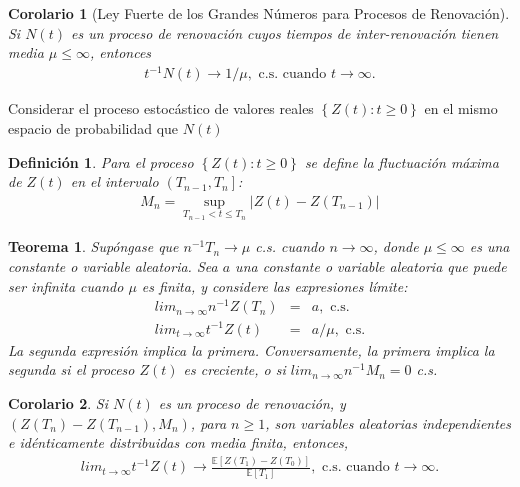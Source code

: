 \documentclass{article}
\newtheorem{Def}{Definición}
\newtheorem{Teo}{Teorema}
\newtheorem{Coro}{Corolario}
\newcommand{\esp}{\mathbb{E}}
\begin{document}
\begin{Coro}[Ley Fuerte de los Grandes N\'umeros para Procesos de Renovaci\'on]
Si $N\left(t\right)$ es un proceso de renovaci\'on cuyos tiempos de inter-renovaci\'on tienen media $\mu\leq\infty$, entonces
\begin{eqnarray}
t^{-1}N\left(t\right)\rightarrow 1/\mu,\textrm{ c.s. cuando }t\rightarrow\infty.
\end{eqnarray}

\end{Coro}


Considerar el proceso estoc\'astico de valores reales $\left\{Z\left(t\right):t\geq0\right\}$ en el mismo espacio de probabilidad que $N\left(t\right)$

\begin{Def}
Para el proceso $\left\{Z\left(t\right):t\geq0\right\}$ se define la fluctuaci\'on m\'axima de $Z\left(t\right)$ en el intervalo $\left(T_{n-1},T_{n}\right]$:
\begin{eqnarray*}
M_{n}=\sup_{T_{n-1}<t\leq T_{n}}|Z\left(t\right)-Z\left(T_{n-1}\right)|
\end{eqnarray*}
\end{Def}

\begin{Teo}
Sup\'ongase que $n^{-1}T_{n}\rightarrow\mu$ c.s. cuando $n\rightarrow\infty$, donde $\mu\leq\infty$ es una constante o variable aleatoria. Sea $a$ una constante o variable aleatoria que puede ser infinita cuando $\mu$ es finita, y considere las expresiones l\'imite:
\begin{eqnarray}
lim_{n\rightarrow\infty}n^{-1}Z\left(T_{n}\right)&=&a,\textrm{ c.s.}\\
lim_{t\rightarrow\infty}t^{-1}Z\left(t\right)&=&a/\mu,\textrm{ c.s.}
\end{eqnarray}
La segunda expresi\'on implica la primera. Conversamente, la primera implica la segunda si el proceso $Z\left(t\right)$ es creciente, o si $lim_{n\rightarrow\infty}n^{-1}M_{n}=0$ c.s.
\end{Teo}

\begin{Coro}
Si $N\left(t\right)$ es un proceso de renovaci\'on, y $\left(Z\left(T_{n}\right)-Z\left(T_{n-1}\right),M_{n}\right)$, para $n\geq1$, son variables aleatorias independientes e id\'enticamente distribuidas con media finita, entonces,
\begin{eqnarray}
lim_{t\rightarrow\infty}t^{-1}Z\left(t\right)\rightarrow\frac{\esp\left[Z\left(T_{1}\right)-Z\left(T_{0}\right)\right]}{\esp\left[T_{1}\right]},\textrm{ c.s. cuando  }t\rightarrow\infty.
\end{eqnarray}
\end{Coro}
\end{document}
